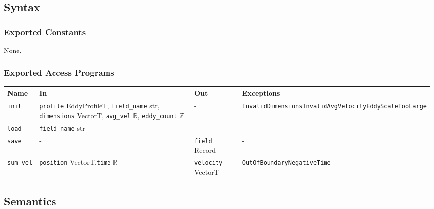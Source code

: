 \documentclass[12pt, titlepage]{article}
\begin{document}
\subsection{Syntax}

\subsubsection{Exported Constants}
None.

\subsubsection{Exported Access Programs}

\begin{center}
\begin{tabular}{p{2cm} p{4.5cm} p{3.5cm} p{4cm}}
\hline
\textbf{Name} & \textbf{In} & \textbf{Out} & \textbf{Exceptions} \\
\hline
\texttt{init} & \texttt{profile} EddyProfileT, \newline\texttt{field\_name} str, \newline\texttt{dimensions} VectorT, \newline\texttt{avg\_vel} $\mathbb{R}$, \newline\texttt{eddy\_count} $\mathbb{Z}$ & - & \texttt{InvalidDimensions}\newline\texttt{InvalidAvgVelocity}\newline\texttt{EddyScaleTooLarge}\\
\texttt{load} & \texttt{field\_name} str & - & -  \\
\texttt{save} & - & \texttt{field} Record & -  \\
\texttt{sum\_vel}& \texttt{position} VectorT,\newline\texttt{time} $\mathbb{R}$ & \texttt{velocity} VectorT & \texttt{OutOfBoundary}\newline\texttt{NegativeTime} \\
\hline
\end{tabular}
\end{center}

\subsection{Semantics}
\end{document}
